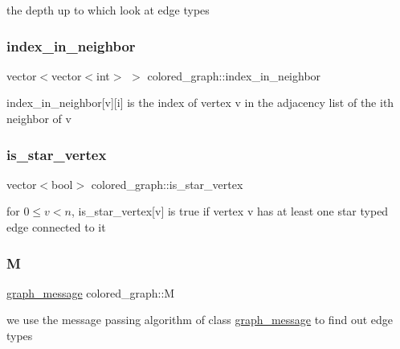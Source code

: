 the depth up to which look at edge types 

\mbox{\label{classcolored__graph_ae28fcd089f9785204d76b6a608bed54f}} 
\subsubsection{\texorpdfstring{index\+\_\+in\+\_\+neighbor}{index\_in\_neighbor}}
{\footnotesize\ttfamily vector$<$vector$<$int$>$ $>$ colored\+\_\+graph\+::index\+\_\+in\+\_\+neighbor}



index\+\_\+in\+\_\+neighbor\mbox{[}v\mbox{]}\mbox{[}i\mbox{]} is the index of vertex v in the adjacency list of the ith neighbor of v 

\mbox{\label{classcolored__graph_ad41163e970530c7e45878d299f0dc961}} 
\subsubsection{\texorpdfstring{is\+\_\+star\+\_\+vertex}{is\_star\_vertex}}
{\footnotesize\ttfamily vector$<$bool$>$ colored\+\_\+graph\+::is\+\_\+star\+\_\+vertex}



for $0 \leq v < n$, is\+\_\+star\+\_\+vertex\mbox{[}v\mbox{]} is true if vertex v has at least one star typed edge connected to it 

\mbox{\label{classcolored__graph_ab72c568fe12f7c849ca6bffb145aec47}} 
\subsubsection{\texorpdfstring{M}{M}}
{\footnotesize\ttfamily \hyperlink{classgraph__message}{graph\+\_\+message} colored\+\_\+graph\+::M}



we use the message passing algorithm of class \hyperlink{classgraph__message}{graph\+\_\+message} to find out edge types 

